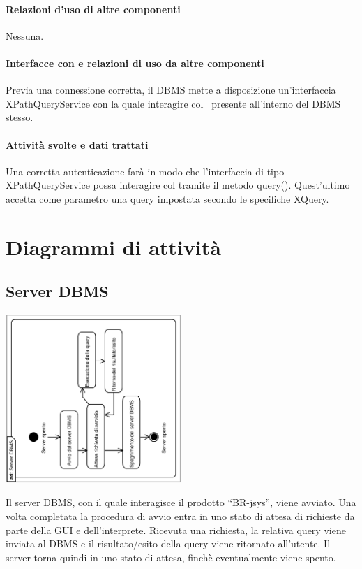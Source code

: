 \documentclass[11pt,titlepage,a4paper]{report}
\begin{document}
\subsubsection{Relazioni d'uso di altre componenti}
Nessuna.
\subsubsection{Interfacce con e relazioni di uso da altre componenti}
Previa una connessione corretta, il DBMS mette a disposizione un'interfaccia XPathQueryService con la quale interagire col \re\ presente all'interno del DBMS stesso.
\subsubsection{Attivit\`a svolte e dati trattati}
Una corretta autenticazione far\`a in modo che l'interfaccia di tipo XPathQueryService possa interagire col \re tramite il metodo query(). Quest'ultimo accetta come parametro una query impostata secondo le specifiche XQuery.


\chapter{Diagrammi di attivit\`a}


\section{Server DBMS}
\begin{center}
 \includegraphics[width=0.5\textwidth, angle=-90]{Server.eps}
\end{center}
Il server DBMS, con il quale interagisce il prodotto ``BR-jsys'', viene avviato. Una volta completata la procedura di avvio entra in uno stato di attesa di richieste da parte della GUI e dell'interprete. Ricevuta una richiesta, la relativa query viene inviata al DBMS e il risultato/esito della query viene ritornato all'utente. Il server torna quindi in uno stato di attesa, finch\`e eventualmente viene spento.
\end{document}
